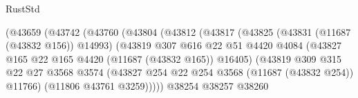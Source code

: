\begin{lexlean}{RustStd}
\begin{coremodule}
                                          (@43659
                                            (@43742
                                              (@43760
                                                (@43804
                                                  (@43812
                                                    (@43817
                                                      (@43825
                                                        (@43831 (@11687 (@43832 @156)) @14993)
                                                        (@43819
                                                          @307
                                                          @616
                                                          @22
                                                          @51
                                                          @4420
                                                          @4084
                                                          (@43827
                                                            @165
                                                            @22
                                                            @165
                                                            @4420
                                                            (@11687 (@43832 @165))
                                                            @16405)
                                                          (@43819
                                                            @309
                                                            @315
                                                            @22
                                                            @27
                                                            @3568
                                                            @3574
                                                            (@43827
                                                              @254
                                                              @22
                                                              @254
                                                              @3568
                                                              (@11687 (@43832 @254))
                                                              @11766)
                                                            (@11806 @43761 @3259)))))
                                                    @38254
                                                    @38257
                                                    @38260

\end{coremodule}
\end{lexlean}
